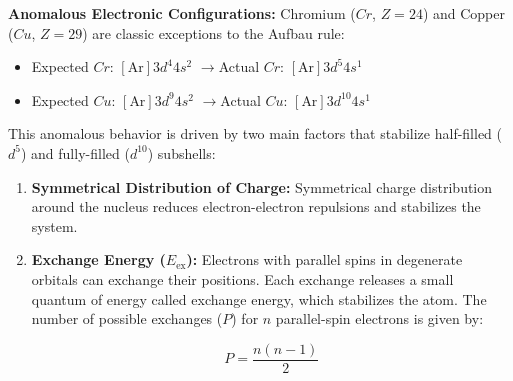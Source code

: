\documentclass[12pt,a4paper]{article}
\begin{document}
\textbf{Anomalous Electronic Configurations:}
Chromium ($Cr$, $Z=24$) and Copper ($Cu$, $Z=29$) are classic exceptions to the Aufbau rule:
\begin{itemize}[leftmargin=*, itemsep=1pt]
  \item Expected $Cr$: $[\text{Ar}]3d^4 4s^2$ \quad$\to$\quad Actual $Cr$: $[\text{Ar}]3d^5 4s^1$
  \item Expected $Cu$: $[\text{Ar}]3d^9 4s^2$ \quad$\to$\quad Actual $Cu$: $[\text{Ar}]3d^{10} 4s^1$
\end{itemize}

This anomalous behavior is driven by two main factors that stabilize half-filled ($d^5$) and fully-filled ($d^{10}$) subshells:
\begin{enumerate}
  \item \textbf{Symmetrical Distribution of Charge:} Symmetrical charge distribution around the nucleus reduces electron-electron repulsions and stabilizes the system.
  \item \textbf{Exchange Energy ($E_{\text{ex}}$):} Electrons with parallel spins in degenerate orbitals can exchange their positions. Each exchange releases a small quantum of energy called exchange energy, which stabilizes the atom. The number of possible exchanges ($P$) for $n$ parallel-spin electrons is given by:
  \begin{tcolorbox}[formulabox, title={Exchange Count Equation}]
    \[ P = \frac{n(n-1)}{2} \]
  \end{tcolorbox}
\end{enumerate}
\end{document}
